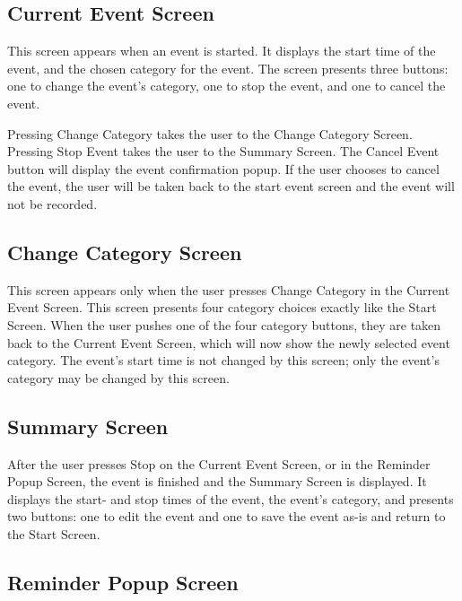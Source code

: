 \documentclass[11pt]{article}
\begin{document}
\subsection{Current Event Screen}

This screen appears when an event is started. It displays the start time of the event, and the chosen category for the event. The screen presents three buttons: one to change the event's category, one to stop the event, and one to cancel the event.

Pressing {\sc Change Category} takes the user to the Change Category Screen. Pressing {\sc Stop Event} takes the user to the Summary Screen. The {\sc Cancel Event} button will display the event confirmation popup. If the user chooses to cancel the event, the user will be taken back to the start event screen and the event will not be recorded.

\subsection{Change Category Screen}

This screen appears only when the user presses {\sc Change Category} in the Current Event Screen. This screen presents four category choices exactly like the Start Screen. When the user pushes one of the four category buttons, they are taken back to the Current Event Screen, which will now show the newly selected event category. The event's start time is not changed by this screen; only the event's category may be changed by this screen.

\subsection{Summary Screen}

After the user presses {\sc Stop}  on the Current Event Screen, or in the Reminder Popup Screen, the event is finished and the Summary Screen is displayed. It displays the start- and stop times of the event, the event's category, and presents two buttons: one to edit the event and one to save the event as-is and return to the Start Screen.

\subsection{Reminder Popup Screen}
\end{document}
